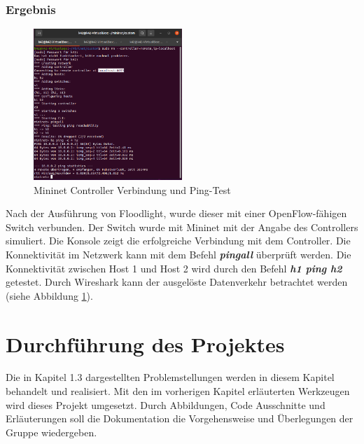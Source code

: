 \documentclass[fontsize=12pt,paper=a4,open=any,parskip=half,
  twoside=false,toc=listof,toc=bibliography,fleqn,leqno,
  captions=nooneline,captions=tableabove,british]{scrbook}
\begin{document}
\newpage
\subsection{Ergebnis}


\begin{figure}
	\vspace{-\baselineskip}
    \centering
    \includegraphics[width=0.5\textwidth]{Bilder/ping}
    \caption{Mininet Controller Verbindung und Ping-Test}
    \label{ping}
\end{figure}

Nach der Ausführung von Floodlight, wurde dieser mit einer OpenFlow-fähigen Switch verbunden. Der Switch wurde mit Mininet mit der Angabe des Controllers simuliert. Die Konsole zeigt die erfolgreiche Verbindung mit dem Controller. Die Konnektivität im Netzwerk kann mit dem Befehl \textit{\textbf{pingall}} überprüft werden. Die Konnektivität zwischen Host 1 und Host 2 wird durch den Befehl \textit{\textbf{h1 ping h2}} getestet. Durch Wireshark kann der ausgelöste Datenverkehr betrachtet werden (siehe Abbildung \ref{ping}).



\chapter{Durchführung des Projektes}
Die in Kapitel 1.3 dargestellten Problemstellungen werden in diesem Kapitel behandelt und realisiert. Mit den im vorherigen Kapitel erläuterten Werkzeugen wird dieses Projekt umgesetzt. Durch Abbildungen, Code Ausschnitte und Erläuterungen soll die Dokumentation die Vorgehensweise und Überlegungen der Gruppe wiedergeben. 
\end{document}
